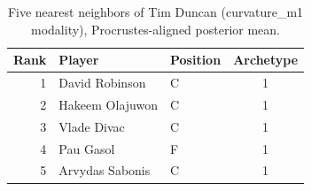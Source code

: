 \begin{table}[htbp]
  \centering\small
  \begin{tabular}{rllc}
    \toprule
    Rank & Player & Position & Archetype \\
    \midrule
    1 & David Robinson & C & 1 \\
    2 & Hakeem Olajuwon & C & 1 \\
    3 & Vlade Divac & C & 1 \\
    4 & Pau Gasol & F & 1 \\
    5 & Arvydas Sabonis & C & 1 \\
    \bottomrule
  \end{tabular}
  \caption{Five nearest neighbors of Tim Duncan (curvature_m1 modality), Procrustes-aligned posterior mean.}
  \label{tab:Tim_Duncan_neighbors_curvature_m1}
\end{table}

